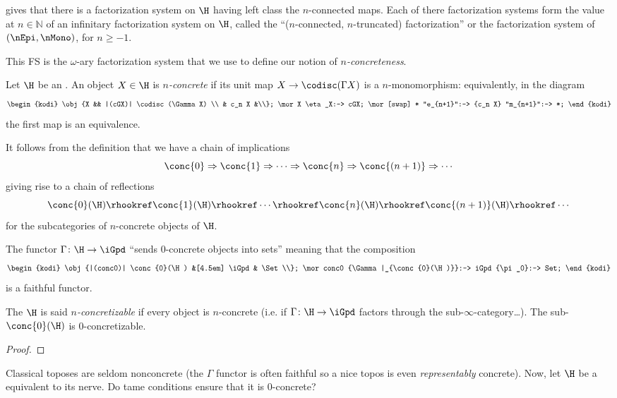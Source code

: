 \documentclass[10pt,a4paper]{amsart}
\begin{document}
\begin{remark}
\cite[6.5.2.8]{HTT} gives that there is a factorization system on $\H$ having left class the $n$-connected maps. Each of there factorization systems form the value at $n\in\mathbb{N}$ of an infinitary factorization system on $\H$, called the ``($n$-connected, $n$-truncated) factorization'' or the factorization system of $(\nEpi, \nMono)$, for $n\ge -1$.
\end{remark}
This FS is the $\omega$-ary factorization system that we use to define our notion of \emph{$n$-concreteness}.
\begin{definition}
Let $\H$ be an \inftop. An object $X\in\H$ is \emph{$n$-concrete} if its unit map $X \to \codisc(\Gamma X)$ is a $n$-monomorphism: equivalently, in the diagram
\[
\begin{kodi}
\obj{X && |(cGX)| \codisc(\Gamma X) \\
& c_n X &\\};
\mor X \eta_X:-> cGX;
\mor[swap] * "e_{n+1}":-> {c_n X} "m_{n+1}":-> *;
\end{kodi}
\]
the first map is an equivalence.
\end{definition}
It follows from the definition that we have a chain of implications
\[
\conc{0} \Rightarrow \conc{1} \Rightarrow \cdots \Rightarrow \conc{n}\Rightarrow \conc{(n+1)}\Rightarrow \cdots
\]
giving rise to a chain of reflections
\[
\conc{0}(\H) \rhookref \conc{1}(\H) \rhookref \cdots \rhookref \conc{n}(\H)\rhookref \conc{(n+1)}(\H)\rhookref \cdots
\]
for the subcategories of $n$-concrete objects of $\H$.
\begin{proposition}
The functor $\Gamma \colon \H \to \iGpd$ ``sends 0-concrete objects into sets'' meaning that the composition
\[
\begin{kodi}
\obj{|(conc0)| \conc{0}(\H) &[4.5em] \iGpd & \Set\\};
\mor conc0 {\Gamma|_{\conc{0}(\H)}}:-> iGpd {\pi_0}:-> Set;
\end{kodi}
\]
is a faithful functor. 

The \inftop $\H$ is said \emph{$n$-concretizable} if every object is $n$-concrete (i.e. if $\Gamma \colon \H\to \iGpd$ factors through the sub-$\infty$-category\dots). The sub-\inftop $\conc{0}(\H)$ is 0-concretizable.
\end{proposition}
\begin{proof}

\end{proof}
\begin{conjec}
Classical toposes are seldom nonconcrete (the $\Gamma$ functor is often faithful so a nice topos is even \emph{representably} concrete). Now, let $\H$ be a \inftop equivalent to its nerve. Do tame conditions ensure that it is 0-concrete?
\end{conjec}
\end{document}
